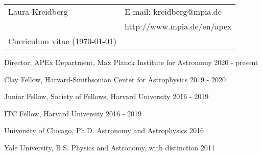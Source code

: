 \documentclass[12pt,letterpaper]{article}
\def\name{Laura R. Kreidberg}
\begin{document}
 \sloppy


\begin{tabular}{@{}p{4.0in}@{}p{5.0in}}
    \LARGE{Laura Kreidberg}                  & E-mail: kreidberg@mpia.de\\  
    \,                                       & http://www.mpia.de/en/apex \\ 
    \large{Curriculum vitae} (\today) & \, \\
\end{tabular}
\vspace{5mm}

\begin{list}{}{\cvlist}
    \item Director, APEx Department, Max Planck Institute for Astronomy \hfill 2020 - present\\
    \item Clay Fellow, Harvard-Smithsonian Center for Astrophysics \hfill 2019 - 2020\\
    \item Junior Fellow, Society of Fellows, Harvard University \hfill 2016 - 2019\\
    \item ITC Fellow, Harvard University \hfill 2016 - 2019\\
\end{list}


\begin{list}{}{\cvlist}
    \item University of Chicago, Ph.D. Astronomy and Astrophysics \hfill 2016
    \item Yale University, B.S. Physics and Astronomy, with distinction \hfill 2011
\end{list}


\end{document}
